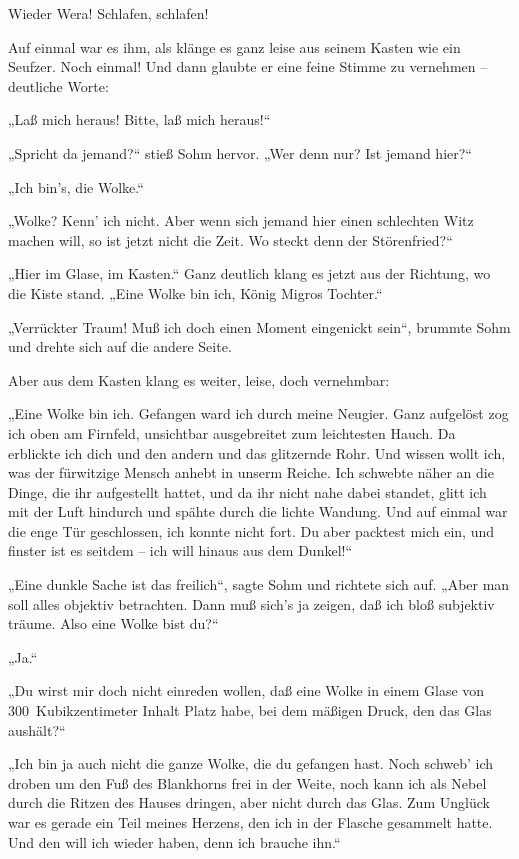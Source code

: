 Wieder Wera! Schlafen, schlafen!

Auf einmal war es ihm, als klänge es ganz leise aus seinem Kasten
wie ein Seufzer. Noch einmal! Und dann glaubte er eine feine Stimme
zu vernehmen – deutliche Worte:

„Laß mich heraus! Bitte, laß mich heraus!“

„Spricht da jemand?“ stieß Sohm hervor. „Wer denn nur? Ist jemand
hier?“

„Ich bin's, die Wolke.“

„Wolke? Kenn' ich nicht. Aber wenn sich jemand hier einen
schlechten Witz machen will, so ist jetzt nicht die Zeit. Wo steckt
denn der Störenfried?“

„Hier im Glase, im Kasten.“ Ganz deutlich klang es jetzt aus der
Richtung, wo die Kiste stand. „Eine Wolke bin ich, König Migros
Tochter.“

„Verrückter Traum! Muß ich doch einen Moment eingenickt sein“,
brummte Sohm und drehte sich auf die andere Seite.

Aber aus dem Kasten klang es weiter, leise, doch vernehmbar:

„Eine Wolke bin ich. Gefangen ward ich durch meine Neugier. Ganz
aufgelöst zog ich oben am Firnfeld, unsichtbar ausgebreitet zum
leichtesten Hauch. Da erblickte ich dich und den andern und das
glitzernde Rohr. Und wissen wollt ich, was der fürwitzige Mensch
anhebt in unserm Reiche. Ich schwebte näher an die Dinge, die ihr
aufgestellt hattet, und da ihr nicht nahe dabei standet, glitt ich
mit der Luft hindurch und spähte durch die lichte Wandung. Und auf
einmal war die enge Tür geschlossen, ich konnte nicht fort. Du aber
packtest mich ein, und finster ist es seitdem – ich will hinaus aus
dem Dunkel!“

„Eine dunkle Sache ist das freilich“, sagte Sohm und richtete sich
auf. „Aber man soll alles objektiv betrachten. Dann muß sich's ja
zeigen, daß ich bloß subjektiv träume. Also eine Wolke bist du?“

„Ja.“

„Du wirst mir doch nicht einreden wollen, daß eine Wolke in einem
Glase von 300~Kubikzentimeter Inhalt Platz habe, bei dem mäßigen
Druck, den das Glas aushält?“

„Ich bin ja auch nicht die ganze Wolke, die du gefangen hast. Noch
schweb' ich droben um den Fuß des Blankhorns frei in der Weite,
noch kann ich als Nebel durch die Ritzen des Hauses dringen, aber
nicht durch das Glas. Zum Unglück war es gerade ein Teil meines
Herzens, den ich in der Flasche gesammelt hatte. Und den will ich
wieder haben, denn ich brauche ihn.“

